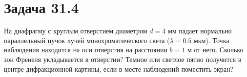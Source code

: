 \section{Задача 31.4}

На диафрагму с круглым отверстием диаметром $d=4$ мм падает нормально параллельный пучок лучей монохроматического света ($\lambda=0.5$ мкм). Точка наблюдения находится на оси отверстия на расстоянии $b=1$ м от него. Сколько зон Френеля укладывается в отверстии? Темное или светлое пятно получится в центре дифракционной картины, если в месте наблюдений поместить экран?